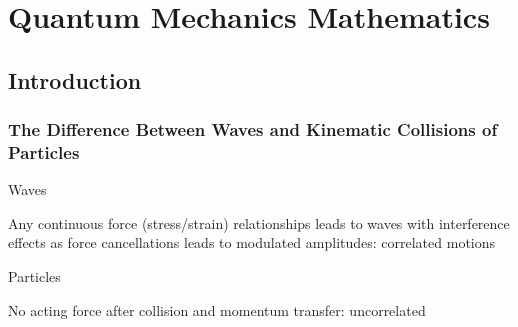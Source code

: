 \documentclass[11pt,fleqn]{book} %
\begin{document}
\chapter{Quantum Mechanics Mathematics}

\section{Introduction}
\subsection*{The Difference Between Waves and Kinematic
Collisions of Particles}
\begin{descriptions}
    \item[Waves]
    \begin{descriptions}
    \end{descriptions}
    Any continuous force (stress/strain) relationships leads to waves with interference effects as force cancellations leads to modulated amplitudes: correlated motions
    \item[Particles]
    \begin{descriptions}
    \end{descriptions}
    No acting force after collision and momentum transfer: uncorrelated
\end{descriptions}
\end{document}
